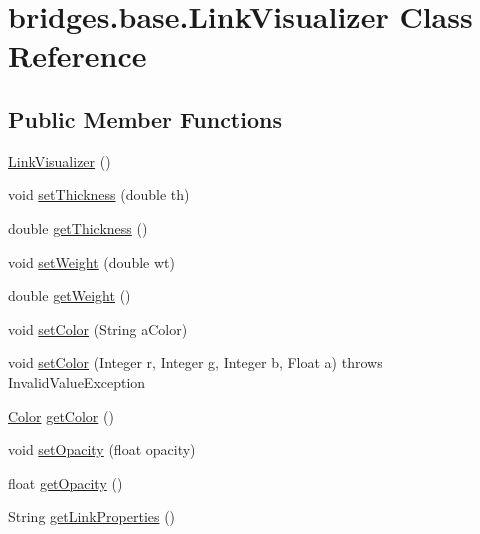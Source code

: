\hypertarget{classbridges_1_1base_1_1_link_visualizer}{}\section{bridges.\+base.\+Link\+Visualizer Class Reference}
\label{classbridges_1_1base_1_1_link_visualizer}
\subsection*{Public Member Functions}
\begin{DoxyCompactItemize}
\item 
\hyperlink{classbridges_1_1base_1_1_link_visualizer_a0b69f099fa264ae9097b0efe278c6a1b}{Link\+Visualizer} ()
\item 
void \hyperlink{classbridges_1_1base_1_1_link_visualizer_a702e9ca345d1a4a035baf2041f275849}{set\+Thickness} (double th)
\item 
double \hyperlink{classbridges_1_1base_1_1_link_visualizer_af1592d2a8664b00c1a51fdc0f8d1860a}{get\+Thickness} ()
\item 
void \hyperlink{classbridges_1_1base_1_1_link_visualizer_a21d5884d243cf5a08f9d544f5083a44c}{set\+Weight} (double wt)
\item 
double \hyperlink{classbridges_1_1base_1_1_link_visualizer_ac96d7fb118ae6c7e1bdd57c5e2c8639a}{get\+Weight} ()
\item 
void \hyperlink{classbridges_1_1base_1_1_link_visualizer_a8c77064e7f40caaf8c3ecda830273a7d}{set\+Color} (String a\+Color)
\item 
void \hyperlink{classbridges_1_1base_1_1_link_visualizer_a003905cfe33e1704555b2b3a1cf99bad}{set\+Color} (Integer r, Integer g, Integer b, Float a)  throws Invalid\+Value\+Exception 
\item 
\hyperlink{classbridges_1_1base_1_1_color}{Color} \hyperlink{classbridges_1_1base_1_1_link_visualizer_a3ed52d98ecab99c6d8dd136fba913b7d}{get\+Color} ()
\item 
void \hyperlink{classbridges_1_1base_1_1_link_visualizer_ac0d59614dbc65ed0a19c25c493a1deaa}{set\+Opacity} (float opacity)
\item 
float \hyperlink{classbridges_1_1base_1_1_link_visualizer_a07cdd435a54e4b612ad63614f2a27a4a}{get\+Opacity} ()
\item 
String \hyperlink{classbridges_1_1base_1_1_link_visualizer_ab64d9b7e2b99f7ebce80cbabfe4adf2a}{get\+Link\+Properties} ()
\end{DoxyCompactItemize}


